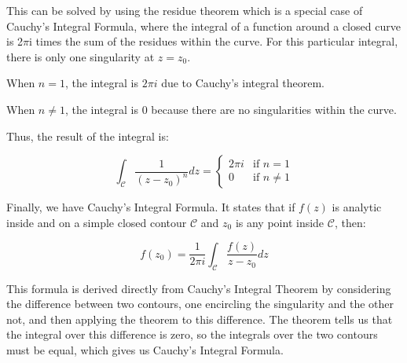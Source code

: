 This can be solved by using the residue theorem which is a special case of Cauchy's Integral Formula, where the integral of a function around a closed curve is 2$\pi$i times the sum of the residues within the curve. For this particular integral, there is only one singularity at $z=z_{0}$.

When $n=1$, the integral is $2\pi i$ due to Cauchy's integral theorem.

When $n\neq1$, the integral is 0 because there are no singularities within the curve.

Thus, the result of the integral is:

\begin{equation*}
\int_{\mathcal{C}} \frac{1}{(z-z_{0})^{n}} dz =
\begin{cases}
2\pi i & \text{if } n=1 \\
0 & \text{if } n\neq1
\end{cases}
\end{equation*}

Finally, we have Cauchy's Integral Formula. It states that if $f(z)$ is analytic inside and on a simple closed contour $\mathcal{C}$ and $z_0$ is any point inside $\mathcal{C}$, then:

\begin{equation*}
f(z_0) = \frac{1}{2\pi i} \int_{\mathcal{C}} \frac{f(z)}{z-z_0} dz
\end{equation*}

This formula is derived directly from Cauchy's Integral Theorem by considering the difference between two contours, one encircling the singularity and the other not, and then applying the theorem to this difference. The theorem tells us that the integral over this difference is zero, so the integrals over the two contours must be equal, which gives us Cauchy's Integral Formula.

